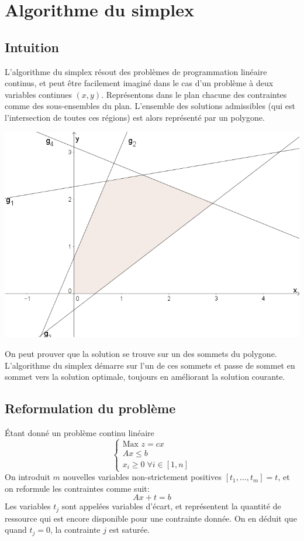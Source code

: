 \documentclass[a4paper]{report}
\begin{document}
\section{Algorithme du simplex}
\subsection{Intuition}
L'algorithme du simplex résout des problèmes de programmation linéaire continus, et peut être facilement imaginé dans le cas d'un problème à deux variables continues \((x,y)\). Représentons dans le plan chacune des contraintes comme des sous-ensembles du plan. L'ensemble des solutions admissibles (qui est l'intersection de toutes ces régions) est alors représenté par un polygone.
\begin{center}\textbf{\textbf{}}
\includegraphics{simplex-xy.png}
\end{center}
On peut prouver que la solution se trouve sur un des sommets du polygone. L'algorithme du simplex démarre sur l'un de ces sommets et passe de sommet en sommet vers la solution optimale, toujours en améliorant la solution courante.
\subsection{Reformulation du problème}
Étant donné un problème continu linéaire
\[\begin{cases}
\text{Max } z=cx \\
Ax \le b \\
x_i\ge0\;\forall i\in[1,n]
\end{cases}\]
On introduit \(m\) nouvelles variables non-strictement positives
\([t_1,\dots,t_m]=t\), et on reformule les contraintes comme suit:
\[Ax+t=b\]
Les variables \(t_j\) sont appelées variables d'écart, et représentent la
quantité de ressource qui est encore disponible pour une contrainte donnée.
On en déduit que quand \(t_j=0\), la contrainte \(j\) est saturée.
\end{document}

